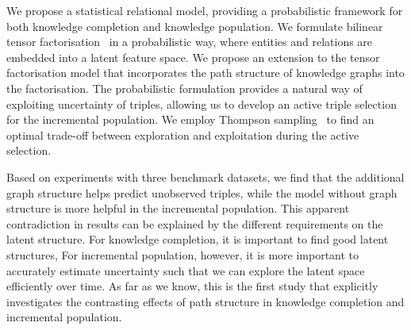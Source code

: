 We propose a statistical relational model, providing a probabilistic framework
for both knowledge completion and knowledge population.
We formulate bilinear tensor factorisation~\cite{nickel2011three} in a probabilistic way, where entities and relations are embedded into a latent feature space. 
We propose an extension to the tensor factorisation model that incorporates the path structure of knowledge graphs into the factorisation. 
The probabilistic formulation provides a natural way of exploiting uncertainty of triples,
allowing us to develop an active triple selection for the incremental population.
We employ Thompson sampling~\cite{scott10bandit} %
to find an optimal trade-off between exploration and exploitation during the active selection.

Based on experiments with three benchmark datasets, we find that the additional graph structure helps predict unobserved triples, while the model without graph structure is more helpful in the incremental population.
This apparent contradiction in results can be explained by the different requirements on
the latent structure. For knowledge completion, it is important to find good latent structures,
For incremental population, however, it is more important to accurately estimate uncertainty
such that we can explore the latent space efficiently over time.
As far as we know, this is the first study that explicitly investigates the contrasting
effects of path structure in knowledge completion and incremental population.


